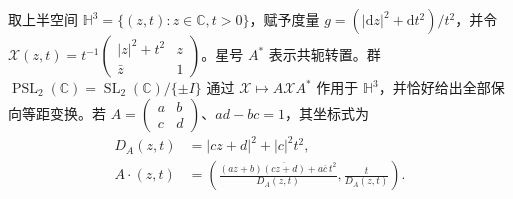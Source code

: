 \begin{proposition}\label{g3:prop:D-psl-complex-isometries}
	取上半空间 \(\mathbb H^3=\{(z,t):z\in\mathbb C,t>0\}\)，赋予度量 \(g=(|\mathrm dz|^2+\mathrm dt^2)/t^2\)，并令 \(\mathcal X(z,t)=t^{-1}\left(\begin{smallmatrix}|z|^2+t^2&z\\\bar z&1\end{smallmatrix}\right)\)。星号 \(A^*\) 表示共轭转置。群 \(\operatorname{PSL}_2(\mathbb C)=\operatorname{SL}_2(\mathbb C)/\{\pm I\}\) 通过
	\(\mathcal X\mapsto A\mathcal XA^*\) 作用于 \(\mathbb H^3\)，并恰好给出全部保向等距变换。若
	\(A=\begin{pmatrix}a&b\\c&d\end{pmatrix}\)、\(ad-bc=1\)，其坐标式为
	\begin{equation}\label{g3:eq:D-psl-upper-halfspace-action}
		\begin{aligned}
			D_A(z,t)&=|cz+d|^2+|c|^2t^2,\\
			A\cdot(z,t)
			&=\left(
			\frac{(az+b)\overline{(cz+d)}+a\overline c\,t^2}{D_A(z,t)},
			\frac{t}{D_A(z,t)}
			\right).
		\end{aligned}
	\end{equation}
\end{proposition}
